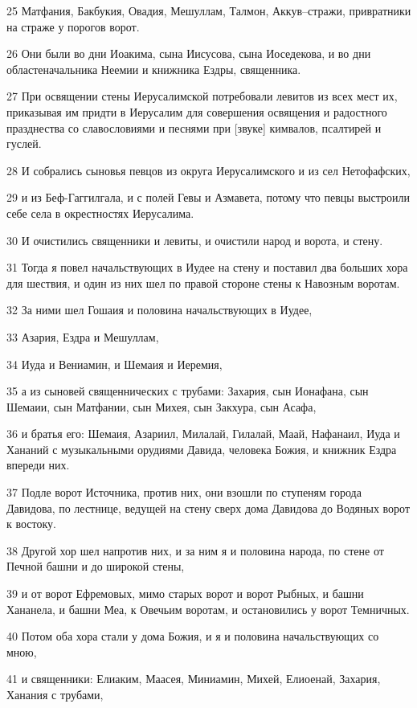 \par 25 Матфания, Бакбукия, Овадия, Мешуллам, Талмон, Аккув--стражи, привратники на страже у порогов ворот.
\par 26 Они были во дни Иоакима, сына Иисусова, сына Иоседекова, и во дни областеначальника Неемии и книжника Ездры, священника.
\par 27 При освящении стены Иерусалимской потребовали левитов из всех мест их, приказывая им придти в Иерусалим для совершения освящения и радостного празднества со славословиями и песнями при [звуке] кимвалов, псалтирей и гуслей.
\par 28 И собрались сыновья певцов из округа Иерусалимского и из сел Нетофафских,
\par 29 и из Беф-Гаггилгала, и с полей Гевы и Азмавета, потому что певцы выстроили себе села в окрестностях Иерусалима.
\par 30 И очистились священники и левиты, и очистили народ и ворота, и стену.
\par 31 Тогда я повел начальствующих в Иудее на стену и поставил два больших хора для шествия, и один из них шел по правой стороне стены к Навозным воротам.
\par 32 За ними шел Гошаия и половина начальствующих в Иудее,
\par 33 Азария, Ездра и Мешуллам,
\par 34 Иуда и Вениамин, и Шемаия и Иеремия,
\par 35 а из сыновей священнических с трубами: Захария, сын Ионафана, сын Шемаии, сын Матфании, сын Михея, сын Закхура, сын Асафа,
\par 36 и братья его: Шемаия, Азариил, Милалай, Гилалай, Маай, Нафанаил, Иуда и Хананий с музыкальными орудиями Давида, человека Божия, и книжник Ездра впереди них.
\par 37 Подле ворот Источника, против них, они взошли по ступеням города Давидова, по лестнице, ведущей на стену сверх дома Давидова до Водяных ворот к востоку.
\par 38 Другой хор шел напротив них, и за ним я и половина народа, по стене от Печной башни и до широкой стены,
\par 39 и от ворот Ефремовых, мимо старых ворот и ворот Рыбных, и башни Хананела, и башни Меа, к Овечьим воротам, и остановились у ворот Темничных.
\par 40 Потом оба хора стали у дома Божия, и я и половина начальствующих со мною,
\par 41 и священники: Елиаким, Маасея, Миниамин, Михей, Елиоенай, Захария, Ханания с трубами,
